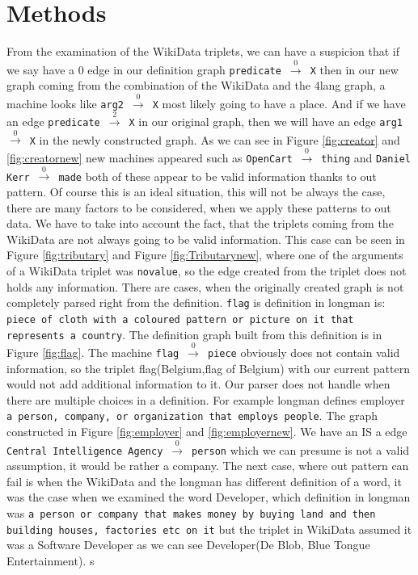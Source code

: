 \documentclass[10pt, a4paper]{article}
\begin{document}
\section{Methods}
\label{sec:Methods}
From the examination of the WikiData triplets, we can have a suspicion that if we say have a 0 edge in our definition graph \texttt{predicate}~$\xrightarrow0$~\texttt{X} then in our new graph coming from the combination of the WikiData and the 4lang graph, a machine looks like \texttt{arg2}~$\xrightarrow0$~\texttt{X} most likely going to have a place. And if we have an edge \texttt{predicate}~$\xrightarrow2$~\texttt{X} in our original graph, then we will have an  edge \texttt{arg1}~$\xrightarrow0$~\texttt{X} in the newly constructed graph. As we can see in Figure \ref{fig:creator} and \ref{fig:creatornew} new machines appeared such as \texttt{OpenCart}~$\xrightarrow0$~\texttt{thing} and \texttt{Daniel Kerr}~$\xrightarrow0$~\texttt{made} both of these appear to be valid information thanks to out pattern. Of course this is an ideal situation, this will not be always the case, there are many factors to be considered, when we apply these patterns to out data. We have to take into account the fact, that the triplets coming from the WikiData are not always going to be valid information. This case can be seen in Figure \ref{fig:tributary} and Figure \ref{fig:Tributarynew}, where one of the arguments of a WikiData triplet was \texttt{novalue}, so the edge created from the triplet does not holds any information. There are cases, when the originally created graph is not completely parsed right from the definition. \texttt{flag} is definition in longman is: \texttt {piece of cloth with a coloured pattern or picture on it that represents a country}. The definition graph built from this definition is in Figure \ref{fig:flag}. The machine \texttt{flag}~$\xrightarrow0$~\texttt{piece} obviously does not contain valid information, so the triplet flag(Belgium,flag of Belgium) with our current pattern would not add additional information to it. Our parser does not handle when there are multiple choices in a definition. For example longman defines employer \texttt{a person, company, or organization that employs people}. The graph constructed in Figure \ref{fig:employer} and \ref{fig:employernew}. We have an IS a edge \texttt{Central Intelligence Agency}~$\xrightarrow0$~\texttt{person} which we can presume is not a valid assumption, it would be rather a company. The next case, where out pattern can fail is when the WikiData and the longman has different definition of a word, it was the case when we examined the word Developer, which definition in longman was \texttt{a person or company that makes money by buying land and then building houses, factories etc on it} but the triplet in WikiData assumed it was a Software Developer as we can see Developer(De Blob, Blue Tongue Entertainment). s
 
\end{document}
